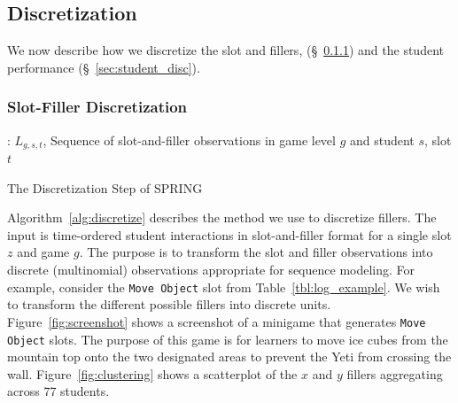 \documentclass{sigchi}
\def\algname{SPRING\xspace}
\begin{document}
	
	
	\subsection{Discretization}
	We now describe how we discretize
	the slot and fillers,  (\S~\ref{sec:filler_disc}) 
	and the student performance (\S~\ref{sec:student_disc}).
	
	\subsubsection{Slot-Filler Discretization}
	\label{sec:filler_disc}
	
	\begin{algorithm}[ht]
		\begin{algorithmic}[1]
			\Require: $L_{g,s,t}$, Sequence of slot-and-filler observations in game level $g$ and student $s$, slot $t$
			
			
			\State
			\EndIf
			\EndFor
			\EndFor
			\State {}
			\EndProcedure
			
		\end{algorithmic}
		\caption{The Discretization Step of \algname \label{alg:discretize}}
	\end{algorithm}
	
	
	Algorithm~\ref{alg:discretize} describes the method we use to discretize fillers.
	The input is time-ordered student interactions in slot-and-filler format for a single slot $z$ and game $g$.
	The purpose is to transform the slot and filler observations into  discrete (multinomial) observations appropriate for sequence modeling.
	For example, consider the \texttt{Move Object} slot from Table~\ref{tbl:log_example}.
	We wish to transform the different possible fillers into discrete units.
	Figure~\ref{fig:screenshot} shows a screenshot of a minigame that generates  \texttt{Move Object} slots.
	The purpose of this game is for learners to move ice cubes from the mountain top onto the two designated areas to prevent the Yeti from crossing the wall.
	Figure~\ref{fig:clustering} shows a scatterplot of the $x$ and $y$ fillers aggregating across 77 students.
	
\end{document}
